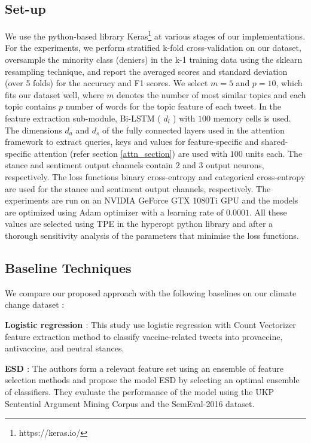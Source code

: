 \documentclass[letterpaper]{article}
\begin{document}
\subsection{Set-up} We use the python-based library Keras\footnote{https://keras.io/} at various stages of our implementations. %
For the experiments, we perform stratified k-fold cross-validation on our dataset, oversample the minority class (deniers) in the k-1 training data using the sklearn resampling technique, and report the averaged scores and standard deviation (over 5 folds) for the accuracy and F1 scores. We select $m=5$ and $p=10$, which fits our dataset well, where $m$ denotes the number of most similar topics and each topic contains $p$ number of words for the topic feature of each tweet. In the feature extraction sub-module, Bi-LSTM ( $d_l$ ) with $100$ memory cells is used. The dimensions $d_a$ and $d_s$ of the fully connected layers used in the attention framework to extract queries, keys and values for feature-specific and shared-specific attention (refer section \ref{attn_section}) are used with $100$ units each. The stance and sentiment output channels contain $2$ and $3$ output neurons, respectively. The loss functions binary cross-entropy and categorical cross-entropy are used for the stance and sentiment output channels, respectively. The experiments are run on an NVIDIA GeForce GTX 1080Ti GPU and the models are optimized using Adam optimizer with a learning rate of $0.0001$. All these values are selected using TPE in the hyperopt python library \cite{bergstra2013hyperopt} and after a thorough sensitivity analysis of the parameters that minimise the loss functions.

\subsection{Baseline Techniques} \label{baselines_section}
We compare our proposed approach with the following baselines on our climate change dataset :
\par\noindent\textbf{Logistic regression \cite{argyris2021using}}: This study use logistic regression with Count Vectorizer feature extraction method to classify vaccine-related tweets into provaccine, antivaccine, and neutral stances.

\par\noindent\textbf{ESD \cite{vychegzhanin2021new}}: The authors form a relevant feature set using an ensemble of feature selection methods and propose the model ESD by selecting an optimal ensemble of classifiers. They evaluate the performance of the model using the UKP Sentential Argument Mining Corpus and the SemEval-2016 dataset.
\end{document}
